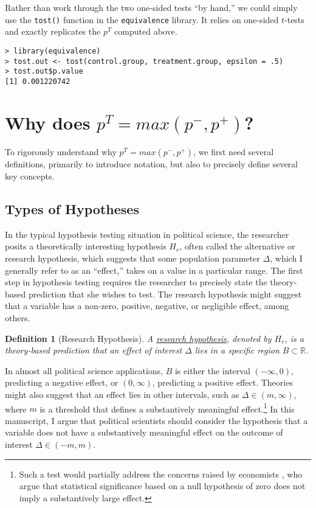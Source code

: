 \documentclass[12pt]{article}
\newtheorem{mydef}{Definition}
\begin{document}
Rather than work through the two one-sided tests ``by hand,'' we could simply use the \texttt{tost()} function in the \texttt{equivalence} library. It relies on one-sided $t$-tests and exactly replicates the $p^T$ computed above.

\begin{verbatim}
> library(equivalence)
> tost.out <- tost(control.group, treatment.group, epsilon = .5)
> tost.out$p.value
[1] 0.001220742
\end{verbatim}

\section*{Why does $p^{T} = max(p^-, p^+)$?}

To rigorously understand why $p^{T}= max(p^-, p^+)$, we first need several definitions, primarily to introduce notation, but also to precisely define several key concepts.

\subsection*{Types of Hypotheses}

In the typical hypothesis testing situation in political science, the researcher posits a theoretically interesting hypothesis $H_r$, often called the alternative or research hypothesis, which suggests that some population parameter $\Delta$, which I generally refer to as an ``effect,'' takes on a value in a particular range. The first step in hypothesis testing requires the researcher to precisely state the theory-based prediction that she wishes to test. The research hypothesis might suggest that a variable has a non-zero, positive, negative, or negligible effect, among others. 
\begin{mydef}[Research Hypothesis]
A \uline{research hypothesis}, denoted by $H_r$, is a theory-based prediction that an effect of interest $\Delta$ lies in a specific region $B \subset \mathbb{R}$.
\end{mydef}
In almost all political science applications, $B$ is either the interval $(-\infty, 0)$, predicting a negative effect, or $(0,\infty)$, predicting a positive effect. Theories might also suggest that an effect lies in other intervals, such as $\Delta \in (m,\infty)$, where $m$ is a threshold that defines a substantively meaningful effect.\footnote{Such a test would partially address the concerns raised by economists \cite{McCloskeyZiliak2008}, who argue that statistical significance based on a null hypothesis of zero does not imply a substantively large effect.} In this manuscript, I argue that political scientists should consider the hypothesis that a variable does not have a substantively meaningful effect on the outcome of interest $\Delta \in (-m,m)$. 
\end{document}
